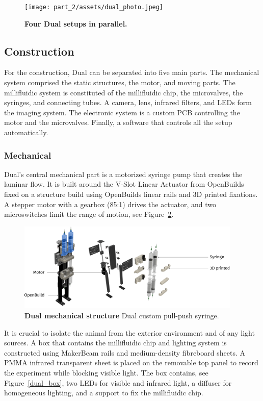     \begin{figure}[h]
      \centering
      \texttt{[image: part\_2/assets/dual\_photo.jpeg]}
      \caption{\textbf{Four Dual setups in parallel.}}
      \label{dual_photo}
    \end{figure}

  \subsection{Construction}
  For the construction, Dual can be separated into five main parts. The mechanical system comprised the static structures, the motor, and moving parts. The millifluidic system is constituted of the millifluidic chip, the microvalves, the syringes, and connecting tubes. A camera, lens, infrared filters, and LEDs form the imaging system. The electronic system is a custom PCB controlling the motor and the microvalves. Finally, a software that controls all the setup automatically.

  \subsubsection{Mechanical}
  Dual's central mechanical part is a motorized syringe pump that creates the laminar flow. It is built around the V-Slot Linear Actuator from OpenBuilds fixed on a structure build using OpenBuilds linear rails and 3D printed fixations. A stepper motor with a gearbox (85:1) drives the actuator, and two microswitches limit the range of motion, see Figure~\ref{dual_mechanical}.

    \begin{figure}[h!]
      \centering
      \includegraphics[width=0.95\textwidth]{part_2/assets/pull_push.png}
      \caption{\textbf{Dual mechanical structure} Dual custom pull-push syringe.}
      \label{dual_mechanical}
    \end{figure}

  It is crucial to isolate the animal from the exterior environment and of any light sources. A box that contains the millifluidic chip and lighting system is constructed using MakerBeam rails and medium-density fibreboard sheets. A PMMA infrared transparent sheet is placed on the removable top panel to record the experiment while blocking visible light. The box contains, see Figure~\ref{dual_box}, two LEDs for visible and infrared light, a diffuser for homogeneous lighting, and a support to fix the millifluidic chip.


